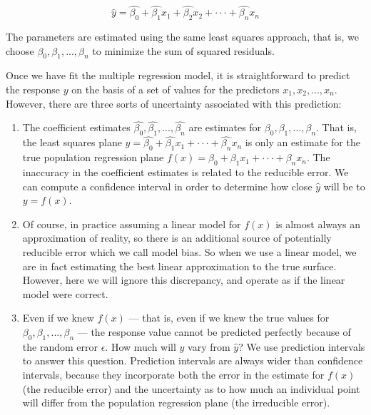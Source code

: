 \begin{equation}
    \hat{y} = \hat{\beta_0} + \hat{\beta_1} x_1 + \hat{\beta_2} x_2 + ··· + \hat{\beta_n} x_n
\end{equation}

The parameters are estimated using the same least squares approach, that is, we choose $\beta_0,
\beta_1, ..., \beta_n$ to minimize the sum of squared residuals.

Once we have fit the multiple regression model, it is straightforward to predict the response $y$ on
the basis of a set of values for the predictors $x_1, x_2, ..., x_n$. However, there are three sorts
of uncertainty associated with this prediction:

\begin{enumerate}
    \item The coefficient estimates $\hat{\beta_0}, \hat{\beta_1}, ..., \hat{\beta_n}$ are estimates
for $\beta_0, \beta_1, ..., \beta_n$. That is, the least squares plane $\hat{y} = \hat{\beta_0} +
\hat{\beta_1} x_1 + ··· + \hat{\beta_n} x_n$ is only an estimate for the true population regression
plane $f(x) = \beta_0 + \beta_1 x_1 + ··· + \beta_n x_n$. The inaccuracy in the coefficient
estimates is related to the reducible error. We can compute a confidence interval in order to
determine how close $\hat{y}$ will be to $y = f(x)$.

    \item Of course, in practice assuming a linear model for $f(x)$ is almost always an
approximation of reality, so there is an additional source of potentially reducible error which we
call model bias. So when we use a linear model, we are in fact estimating the best linear
approximation to the true surface. However, here we will ignore this discrepancy, and operate as if
the linear model were correct.

    \item Even if we knew $f(x)$ --- that is, even if we knew the true values for $\beta_0, \beta_1,
..., \beta_n$ --- the response value cannot be predicted perfectly because of the random error
$\epsilon$. How much will $y$ vary from $\hat{y}$? We use prediction intervals to answer this
question. Prediction intervals are always wider than confidence intervals, because they incorporate
both the error in the estimate for $f(x)$ (the reducible error) and the uncertainty as to how much
an individual point will differ from the population regression plane (the irreducible error).
\end{enumerate}


